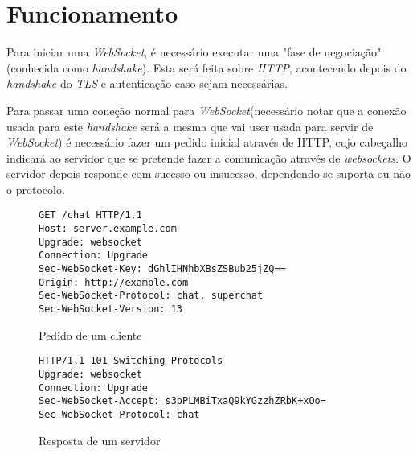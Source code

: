 \documentclass[a4paper]{article}
\begin{document}
\section{Funcionamento}

Para iniciar uma \emph{WebSocket}, é necessário executar uma "fase de negociação" (conhecida como \emph{handshake}). Esta será feita sobre \emph{HTTP}, acontecendo depois do \emph{handshake} do \emph{TLS} e autenticação caso sejam necessárias.

Para passar uma coneção normal para \emph{WebSocket}(necessário notar que a conexão usada para este \emph{handshake} será a mesma que vai user usada para servir de \emph{WebSocket}) é necessário fazer um pedido inicial através de HTTP, cujo cabeçalho indicará ao servidor que se pretende fazer a comunicação através de \emph{websockets}. O servidor depois responde com sucesso ou insucesso, dependendo se suporta ou não o protocolo.

\begin{figure}
	\begin{framed}
		\texttt{\small GET /chat HTTP/1.1 \\
						Host: server.example.com \\
						Upgrade: websocket\\
						Connection: Upgrade\\
						Sec-WebSocket-Key: dGhlIHNhbXBsZSBub25jZQ==\\
						Origin: http://example.com\\
						Sec-WebSocket-Protocol: chat, superchat\\
						Sec-WebSocket-Version: 13\\
		}		
	\end{framed}
	\caption{Pedido de um cliente}
  \label{fig:httpHeaderReq}
\end{figure}

\begin{figure}
	\begin{framed}
		\texttt{\small HTTP/1.1 101 Switching Protocols\\
					Upgrade: websocket\\
					Connection: Upgrade\\
					Sec-WebSocket-Accept: s3pPLMBiTxaQ9kYGzzhZRbK+xOo=\\
					Sec-WebSocket-Protocol: chat\\
		}
	\end{framed}
		\caption{Resposta de um servidor}
  \label{fig:httpHeaderRspS}
\end{figure}
\end{document}
